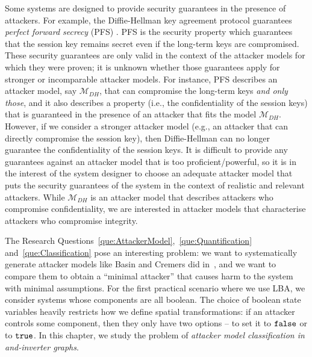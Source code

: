     

\label{sec:Classification:ClassificationProblem}
Some systems are designed to provide security guarantees in the presence of attackers. For example, the Diffie-Hellman key agreement protocol guarantees \emph{perfect forward secrecy} (PFS) \cite{Gunther1990,Menezes1996}. PFS is the security property which guarantees that the session key remains secret even if the long-term keys are compromised. These security guarantees are only valid in the context of the attacker models for which they were proven; it is unknown whether those guarantees apply for stronger or incomparable attacker models. For instance, PFS describes an attacker model, say $\mathcal{M}_{DH}$, that can compromise the long-term keys \emph{and only those}, and it also describes a property (i.e., the confidentiality of the session keys) that is guaranteed in the presence of an attacker that fits the model $\mathcal{M}_{DH}$. However, if we consider a stronger attacker model (e.g., an attacker that can directly compromise the session key), then Diffie-Hellman can no longer guarantee the confidentiality of the session keys. It is difficult to provide any guarantees against an attacker model that is too proficient/powerful, so it is in the interest of the system designer to choose an adequate attacker model that puts the security guarantees of the system in the context of realistic and relevant attackers. While $\mathcal{M}_{DH}$ is an attacker model that describes attackers who compromise confidentiality, we are interested in attacker models that characterise attackers who compromise integrity. 

The Research Questions~\ref{que:AttackerModel},~\ref{que:Quantification} and~\ref{que:Classification} pose an interesting problem: we want to systematically generate attacker models like Basin and Cremers did in~\cite{KnowYourEnemy}, and we want to compare them to obtain a ``minimal attacker'' that causes harm to the system with minimal assumptions. For the first practical scenario where we use LBA, we consider systems whose components are all boolean. The choice of boolean state variables heavily restricts how we define spatial transformations: if an attacker controls some component, then they only have two options -- to set it to $\mathtt{\texttt{false}}$ or to $\mathtt{\texttt{true}}$. In this chapter, we study the problem of \emph{attacker model classification in and-inverter graphs}.

